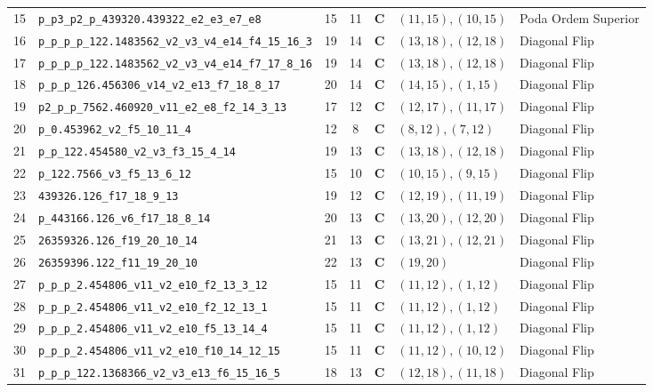 \documentclass[10pt,a4paper]{article}
\begin{document}
\begin{small}
\begin{longtable}{r l c c c l l}
15 & \texttt{p\_p3\_p2\_p\_439320.439322\_e2\_e3\_e7\_e8} & 15 & 11 & \textbf{C} & $(11,15), (10,15)$ & Poda Ordem Superior \\
16 & \texttt{p\_p\_p\_p\_122.1483562\_v2\_v3\_v4\_e14\_f4\_15\_16\_3} & 19 & 14 & \textbf{C} & $(13,18), (12,18)$ & Diagonal Flip \\
17 & \texttt{p\_p\_p\_p\_122.1483562\_v2\_v3\_v4\_e14\_f7\_17\_8\_16} & 19 & 14 & \textbf{C} & $(13,18), (12,18)$ & Diagonal Flip \\
18 & \texttt{p\_p\_p\_126.456306\_v14\_v2\_e13\_f7\_18\_8\_17} & 20 & 14 & \textbf{C} & $(14,15), (1,15)$ & Diagonal Flip \\
19 & \texttt{p2\_p\_p\_7562.460920\_v11\_e2\_e8\_f2\_14\_3\_13} & 17 & 12 & \textbf{C} & $(12,17), (11,17)$ & Diagonal Flip \\
20 & \texttt{p\_0.453962\_v2\_f5\_10\_11\_4} & 12 & 8 & \textbf{C} & $(8,12), (7,12)$ & Diagonal Flip \\
21 & \texttt{p\_p\_122.454580\_v2\_v3\_f3\_15\_4\_14} & 19 & 13 & \textbf{C} & $(13,18), (12,18)$ & Diagonal Flip \\
22 & \texttt{p\_122.7566\_v3\_f5\_13\_6\_12} & 15 & 10 & \textbf{C} & $(10,15), (9,15)$ & Diagonal Flip \\
23 & \texttt{439326.126\_f17\_18\_9\_13} & 19 & 12 & \textbf{C} & $(12,19), (11,19)$ & Diagonal Flip \\
24 & \texttt{p\_443166.126\_v6\_f17\_18\_8\_14} & 20 & 13 & \textbf{C} & $(13,20), (12,20)$ & Diagonal Flip \\
25 & \texttt{26359326.126\_f19\_20\_10\_14} & 21 & 13 & \textbf{C} & $(13,21), (12,21)$ & Diagonal Flip \\
26 & \texttt{26359396.122\_f11\_19\_20\_10} & 22 & 13 & \textbf{C} & $(19,20)$ & Diagonal Flip \\
27 & \texttt{p\_p\_p\_2.454806\_v11\_v2\_e10\_f2\_13\_3\_12} & 15 & 11 & \textbf{C} & $(11,12), (1,12)$ & Diagonal Flip \\
28 & \texttt{p\_p\_p\_2.454806\_v11\_v2\_e10\_f2\_12\_13\_1} & 15 & 11 & \textbf{C} & $(11,12), (1,12)$ & Diagonal Flip \\
29 & \texttt{p\_p\_p\_2.454806\_v11\_v2\_e10\_f5\_13\_14\_4} & 15 & 11 & \textbf{C} & $(11,12), (1,12)$ & Diagonal Flip \\
30 & \texttt{p\_p\_p\_2.454806\_v11\_v2\_e10\_f10\_14\_12\_15} & 15 & 11 & \textbf{C} & $(11,12), (10,12)$ & Diagonal Flip \\
31 & \texttt{p\_p\_p\_122.1368366\_v2\_v3\_e13\_f6\_15\_16\_5} & 18 & 13 & \textbf{C} & $(12,18), (11,18)$ & Diagonal Flip \\

\end{longtable}
\end{small}
\end{document}

